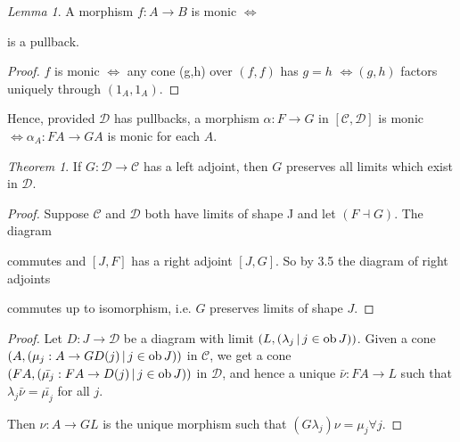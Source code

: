 \documentclass[a4paper]{article}
\theoremstyle{definition}
\theoremstyle{remark}
\theoremstyle{default}
\newtheorem{lemma}[definition]{Lemma}
\newtheorem{theorem}[definition]{Theorem}
\numberwithin{definition}{section}
\newcommand*\ob[1]{\textnormal{ob}\,#1}
\begin{document}
\begin{lemma}
	A morphism $f: A \to B$ is monic $\iff$
	\begin{center}
	\end{center}
	is a pullback.
\end{lemma}
\begin{proof}
	$f$ is monic $\iff$ any cone (g,h) over $(f, f)$ has $g=h$
	$\iff (g, h)$ factors uniquely through $(1_A, 1_A)$.
\end{proof}

Hence, provided $\mathcal{D}$ has pullbacks,
a morphism $\alpha: F \to G$ in $[\mathcal{C}, \mathcal{D}]$
is monic $\iff \alpha_A: FA \to GA$ is monic for each $A$.

\begin{theorem}
	If $G: \mathcal{D} \to \mathcal{C}$ has a left adjoint,
	then $G$ preserves all limits which exist in $\mathcal{D}$.
	\label{410}
\end{theorem}
\begin{proof}
	Suppose $\mathcal{C}$ and $\mathcal{D}$ both have limits of shape J and let $(F \dashv G)$.
	The diagram
	\begin{center}
	\end{center}
	commutes and $[J, F]$ has a right adjoint $[J, G]$.
	So by 3.5 the diagram of right adjoints
	\begin{center}
	\end{center}
	commutes up to isomorphism,
	i.e. $G$ preserves limits of shape $J$.
\end{proof}
\begin{proof}
	Let $D:J \to \mathcal{D}$ be a diagram with limit $(L, (\lambda_j \,|\, j \in \ob J))$.
	Given a cone $(A, (\mu_j: A \to GD(j) \,|\, j \in \ob J))$ in $\mathcal{C}$,
	we get a cone $(FA, (\bar{\mu_j} : FA \to D(j) \,|\, j \in \ob J))$ in $\mathcal{D}$,
	and hence a unique $\bar{\nu}:FA \to L$ such that $\lambda_j\bar{\nu} = \bar{\mu_j}$ for all $j$.
	
	Then $\nu: A \to GL$ is the unique morphism such that $(G\lambda_j)\nu = \mu_j \forall j$.
\end{proof}
\end{document}
